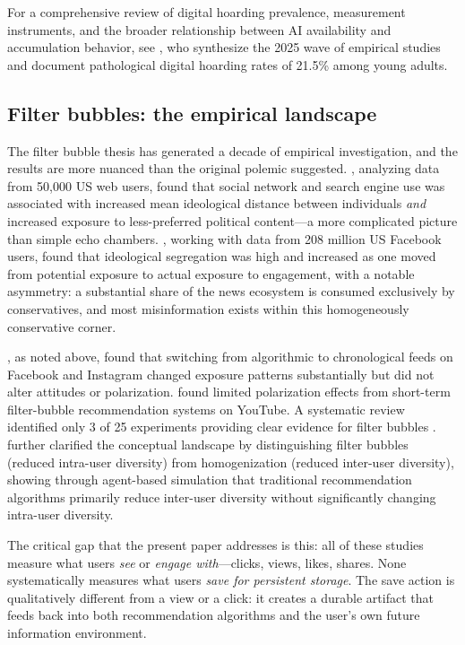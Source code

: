 \documentclass[12pt,a4paper]{article}
\begin{document}
For a comprehensive review of digital hoarding prevalence, measurement instruments, and the broader relationship between AI availability and accumulation behavior, see \citet{Author2026b}, who synthesize the 2025 wave of empirical studies and document pathological digital hoarding rates of 21.5\% among young adults.


\subsection{Filter bubbles: the empirical landscape}

The filter bubble thesis \citep{Pariser2011} has generated a decade of empirical investigation, and the results are more nuanced than the original polemic suggested.
\citet{Flaxman2016}, analyzing data from 50,000 US web users, found that social network and search engine use was associated with increased mean ideological distance between individuals \emph{and} increased exposure to less-preferred political content---a more complicated picture than simple echo chambers.
\citet{GonzalezBailon2023}, working with data from 208 million US Facebook users, found that ideological segregation was high and increased as one moved from potential exposure to actual exposure to engagement, with a notable asymmetry: a substantial share of the news ecosystem is consumed exclusively by conservatives, and most misinformation exists within this homogeneously conservative corner.

\citet{Guess2023}, as noted above, found that switching from algorithmic to chronological feeds on Facebook and Instagram changed exposure patterns substantially but did not alter attitudes or polarization.
\citet{Liu2025} found limited polarization effects from short-term filter-bubble recommendation systems on YouTube.
A systematic review identified only 3 of 25 experiments providing clear evidence for filter bubbles \citep{Areeb2023}.
\citet{Anwar2024} further clarified the conceptual landscape by distinguishing filter bubbles (reduced intra-user diversity) from homogenization (reduced inter-user diversity), showing through agent-based simulation that traditional recommendation algorithms primarily reduce inter-user diversity without significantly changing intra-user diversity.

The critical gap that the present paper addresses is this: all of these studies measure what users \emph{see} or \emph{engage with}---clicks, views, likes, shares.
None systematically measures what users \emph{save for persistent storage}.
The save action is qualitatively different from a view or a click: it creates a durable artifact that feeds back into both recommendation algorithms and the user's own future information environment.
\end{document}
